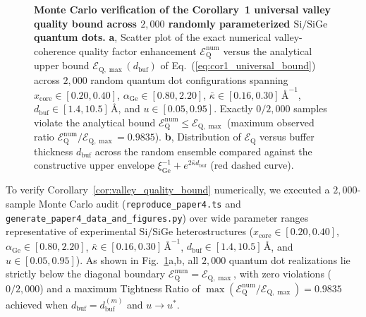 \documentclass[11pt,letterpaper]{article}
\theoremstyle{definition}
\begin{document}
\begin{figure}[t!]
  \centering
  
  \caption{\textbf{Monte Carlo verification of the Corollary~1 universal valley quality bound across $2{,}000$ randomly parameterized $\mathrm{Si/SiGe}$ quantum dots.} \textbf{a}, Scatter plot of the exact numerical valley-coherence quality factor enhancement $\mathcal{E}_{\mathrm{Q}}^{\mathrm{num}}$ versus the analytical upper bound $\mathcal{E}_{\mathrm{Q},\max}(d_{\mathrm{buf}})$ of Eq.~(\ref{eq:cor1_universal_bound}) across $2{,}000$ random quantum dot configurations spanning $x_{\mathrm{core}} \in [0.20, 0.40]$, $\alpha_{\mathrm{Ge}} \in [0.80, 2.20]$, $\bar{\kappa} \in [0.16, 0.30]\,\text{\AA}^{-1}$, $d_{\mathrm{buf}} \in [1.4, 10.5]\,\text{\AA}$, and $u \in [0.05, 0.95]$. Exactly $0/2{,}000$ samples violate the analytical bound $\mathcal{E}_{\mathrm{Q}}^{\mathrm{num}} \le \mathcal{E}_{\mathrm{Q},\max}$ (maximum observed ratio $\mathcal{E}_{\mathrm{Q}}^{\mathrm{num}}/\mathcal{E}_{\mathrm{Q},\max} = 0.9835$). \textbf{b}, Distribution of $\mathcal{E}_{\mathrm{Q}}$ versus buffer thickness $d_{\mathrm{buf}}$ across the random ensemble compared against the constructive upper envelope $\xi_{\mathrm{Ge}}^{-1} + e^{2\bar{\kappa} d_{\mathrm{buf}}}$ (red dashed curve).}
  \label{fig:corollary1_verification}
\end{figure}

To verify Corollary~\ref{cor:valley_quality_bound} numerically, we executed a $2{,}000$-sample Monte Carlo audit (\texttt{reproduce\_paper4.ts} and \texttt{generate\_paper4\_data\_and\_figures.py}) over wide parameter ranges representative of experimental $\mathrm{Si/SiGe}$ heterostructures ($x_{\mathrm{core}} \in [0.20, 0.40]$, $\alpha_{\mathrm{Ge}} \in [0.80, 2.20]$, $\bar{\kappa} \in [0.16, 0.30]\,\text{\AA}^{-1}$, $d_{\mathrm{buf}} \in [1.4, 10.5]\,\text{\AA}$, and $u \in [0.05, 0.95]$). As shown in Fig.~\ref{fig:corollary1_verification}a,b, all $2{,}000$ quantum dot realizations lie strictly below the diagonal boundary $\mathcal{E}_{\mathrm{Q}}^{\mathrm{num}} = \mathcal{E}_{\mathrm{Q},\max}$, with zero violations ($0/2{,}000$) and a maximum Tightness Ratio of $\max(\mathcal{E}_{\mathrm{Q}}^{\mathrm{num}} / \mathcal{E}_{\mathrm{Q},\max}) = 0.9835$ achieved when $d_{\mathrm{buf}} = d_{\mathrm{buf}}^{(m)}$ and $u \to u^*$.
\end{document}

